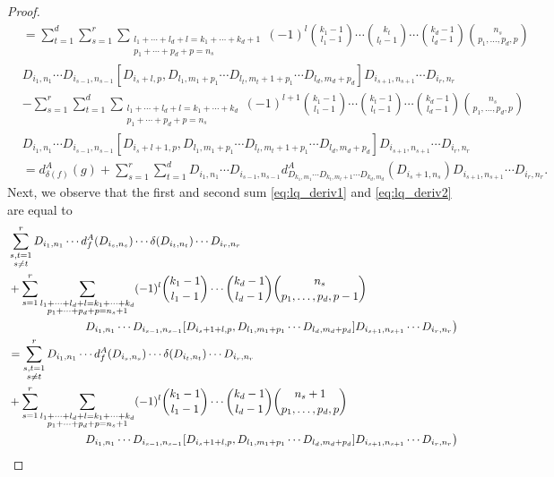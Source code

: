 \documentclass[12pt,reqno]{amsart}
\numberwithin{equation}{section}
\theoremstyle{definition}
\newcommand{\der}[1]{d_{#1}^A}
\begin{document}
\begin{proof}
\begin{align*}
&=\sum_{t=1}^d\sum_{s=1}^r\sum_{\substack{l_1+\cdots+l_d+l=k_1+\cdots+k_d+1 \\ p_1+\cdots+p_d+p=n_s}} (-1)^l\binom{k_1-1}{l_1-1}\cdots \binom{k_t}{l_t-1}\cdots \binom{k_d-1}{l_d-1} \binom{n_s}{p_1,\ldots,p_d,p} \\
&D_{i_1,n_1}\cdots D_{i_{s-1},n_{s-1}}[D_{i_s+l,p},D_{l_1,m_1+p_1}\cdots D_{l_t,m_t+1+p_1} \cdots D_{l_d,m_d+p_d}]D_{i_{s+1},n_{s+1}}\cdots D_{i_r,n_r} \\
&-\sum_{s=1}^r \sum_{t=1}^d\sum_{\substack{l_1+\cdots+l_d+l=k_1+\cdots+k_d \\ p_1+\cdots+p_d+p=n_s}} (-1)^{l+1}\binom{k_1-1}{l_1-1}\cdots \binom{k_t-1}{l_t-1}\cdots \binom{k_d-1}{l_d-1} \binom{n_s}{p_1,\ldots,p_d,p} \\
&D_{i_1,n_1}\cdots D_{i_{s-1},n_{s-1}}[D_{i_s+l+1,p},D_{l_1,m_1+p_1}\cdots D_{l_t,m_t+1+p_1} \cdots D_{l_d,m_d+p_d}]D_{i_{s+1},n_{s+1}}\cdots D_{i_r,n_r} \\
&=\der{\delta(f)}(g)+\sum_{s=1}^r \sum_{t=1}^dD_{i_1,n_1}\cdots D_{i_{s-1},n_{s-1}} \der{D_{k_1,m_1}\cdots D_{k_t,m_t+1}\cdots D_{k_d,m_d}}(D_{i_s+1,n_s} )D_{i_{s+1},n_{s+1}}\cdots D_{i_r,n_r}.
\end{align*}
Next, we observe that the first and second sum \eqref{eq:lq_deriv1} and \eqref{eq:lq_deriv2} are equal to
\begin{align*}
&\sum_{\substack{s,t=1 \\ s\neq t}}^r D_{i_1,n_1}\cdots \der{f}(D_{i_s,n_s})\cdots \delta(D_{i_t,n_t})\cdots D_{i_r,n_r} \\
&+\sum_{s=1}^r\sum_{\substack{l_1+\cdots+l_d+l=k_1+\cdots+k_d \\ p_1+\cdots+p_d+p=n_s+1}} (-1)^l\binom{k_1-1}{l_1-1}\cdots \binom{k_d-1}{l_d-1} \binom{n_s}{p_1,\ldots,p_d,p-1}  \\
&\hspace{2.4cm} D_{i_1,n_1}\cdots D_{i_{s-1},n_{s-1}}[D_{i_s+1+l,p},D_{l_1,m_1+p_1}\cdots D_{l_d,m_d+p_d}]D_{i_{s+1},n_{s+1}}\cdots D_{i_r,n_r}\big)\\
&=\sum_{\substack{s,t=1 \\ s\neq t}}^r D_{i_1,n_1}\cdots \der{f}(D_{i_s,n_s})\cdots \delta(D_{i_t,n_t})\cdots D_{i_r,n_r} \\
&+\sum_{s=1}^r\sum_{\substack{l_1+\cdots+l_d+l=k_1+\cdots+k_d \\ p_1+\cdots+p_d+p=n_s+1}} (-1)^l\binom{k_1-1}{l_1-1}\cdots \binom{k_d-1}{l_d-1} \binom{n_s+1}{p_1,\ldots,p_d,p}  \\
&\hspace{2.4cm} D_{i_1,n_1}\cdots D_{i_{s-1},n_{s-1}}[D_{i_s+1+l,p},D_{l_1,m_1+p_1}\cdots D_{l_d,m_d+p_d}]D_{i_{s+1},n_{s+1}}\cdots D_{i_r,n_r}\big)\\

\end{align*}
\end{proof}
\end{document}
